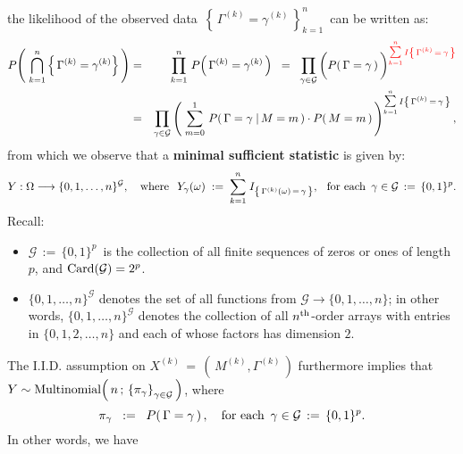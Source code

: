 \begin{remark}
the likelihood of the observed data \,$\left\{\,\Gamma^{(k)} = \gamma^{(k)}\,\right\}_{k=1}^{n}$\,
can be written as:
\begin{eqnarray*}
P\!\left(\;\bigcap_{k=1}^{n} \left\{\,\Gamma^{(k)} = \gamma^{(k)}\right\}\,\right)
& = & \prod_{k=1}^{n} \, P\!\left(\,\Gamma^{(k)} = \gamma^{(k)}\,\right)
\;\; = \;\;
	\prod_{\gamma\in\mathcal{G}} \left(
		\overset{{\color{white}-}}{P}\!\left(\,\Gamma = \gamma\,\right)
	\,\right)^{\color{red}\overset{n}{\underset{k=1}{\textnormal{\normalsize$\sum$}}}\,I\left\{\,\Gamma^{(k)}\,=\,\gamma\,\right\}}
\\
& = &
	\prod_{\gamma\in\mathcal{G}} \left(\;
		\sum_{m=0}^{1}\,P\!\left(\,\Gamma = \gamma\;\vert\,M = m\,\right)\cdot P\!\left(\,M=m\,\right)
	\,\right)^{\overset{n}{\underset{k=1}{\textnormal{\normalsize$\sum$}}}\,I\left\{\,\Gamma^{(k)}\,=\,\gamma\,\right\}},
\end{eqnarray*}
from which we observe that a \textbf{minimal sufficient statistic} is given by:
\begin{equation*}
Y : \Omega \longrightarrow \{0,1,\ldots,n\}^{\mathcal{G}},
\quad\textnormal{where}\;\;\,
Y_{\gamma}(\omega) \; := \; \overset{n}{\underset{k=1}{\sum}}\;I_{\left\{\,\Gamma^{(k)}(\omega) \,=\, \gamma\,\right\}},
\;\;\,\textnormal{for each \,$\gamma\in\mathcal{G} \,:=\, \{0,1\}^{p}$}.
\end{equation*}
Recall:
\begin{itemize}
\item
	$\mathcal{G} \,:=\, \{0,1\}^{p}$\, is the collection of all finite sequences of zeros or ones of length $p$,
	and $\textnormal{Card}\!\left(\mathcal{G}\right) = 2^{p}$.
\item
	$\{0,1,\ldots,n\}^{\mathcal{G}}$ denotes the set of all functions from $\mathcal{G} \longrightarrow \{0,1,\ldots,n\}$;
	in other words, $\{0,1,\ldots,n\}^{\mathcal{G}}$ denotes the collection of all $n^{\textnormal{th}}$-order arrays
	with entries in $\{0,1,2,\ldots,n\}$ and each of whose factors has dimension $2$.
\end{itemize}
The I.I.D. assumption on $X^{(k)} \,=\, \left(\,M^{(k)},\Gamma^{(k)}\,\right)$ furthermore implies that
\,$Y \sim \textnormal{Multinomial}\!\left(\,n\,;\,\left\{\pi_{\gamma}\right\}_{\gamma\in\mathcal{G}}\,\right)$,
where
\begin{equation*}
\pi_{\gamma} \;\; := \;\; P\!\left(\,\Gamma = \gamma\,\right),
\quad\textnormal{for each \,$\gamma\in\mathcal{G}\,:=\,\{0,1\}^{p}$}.
\end{equation*}
In other words, we have

\end{remark}
